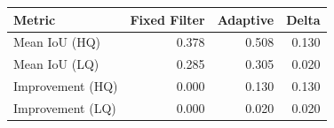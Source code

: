 \begin{tabular}{lrrr}
\toprule
Metric & Fixed Filter & Adaptive & Delta \\
\midrule
Mean IoU (HQ) & 0.378 & 0.508 & 0.130 \\
Mean IoU (LQ) & 0.285 & 0.305 & 0.020 \\
Improvement (HQ) & 0.000 & 0.130 & 0.130 \\
Improvement (LQ) & 0.000 & 0.020 & 0.020 \\
\bottomrule
\end{tabular}
